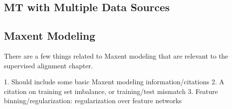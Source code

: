 \subsection{MT with Multiple Data Sources}

\subsection{Maxent Modeling}
There are a few things related to Maxent modeling that are relevant to
the supervised alignment chapter.

1. Should include some basic Maxent modeling information/citations
2. A citation on training set imbalance, or training/test mismatch
3. Feature binning/regularization: regularization over feature networks

